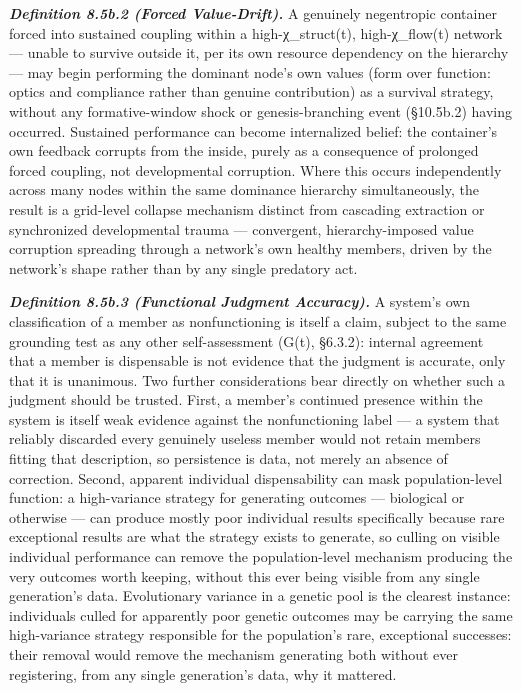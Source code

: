 \documentclass[
]{article}
\begin{document}
\emph{\textbf{Definition 8.5b.2 (Forced Value-Drift).}} A genuinely
negentropic container forced into sustained coupling within a
high-χ\_struct(t), high-χ\_flow(t) network --- unable to survive outside
it, per its own resource dependency on the hierarchy --- may begin
performing the dominant node's own values (form over function: optics
and compliance rather than genuine contribution) as a survival strategy,
without any formative-window shock or genesis-branching event (§10.5b.2)
having occurred. Sustained performance can become internalized belief:
the container's own feedback corrupts from the inside, purely as a
consequence of prolonged forced coupling, not developmental corruption.
Where this occurs independently across many nodes within the same
dominance hierarchy simultaneously, the result is a grid-level collapse
mechanism distinct from cascading extraction or synchronized
developmental trauma --- convergent, hierarchy-imposed value corruption
spreading through a network's own healthy members, driven by the
network's shape rather than by any single predatory act.

\emph{\textbf{Definition 8.5b.3 (Functional Judgment Accuracy).}} A
system's own classification of a member as nonfunctioning is itself a
claim, subject to the same grounding test as any other self-assessment
(G(t), §6.3.2): internal agreement that a member is dispensable is not
evidence that the judgment is accurate, only that it is unanimous. Two
further considerations bear directly on whether such a judgment should
be trusted. First, a member's continued presence within the system is
itself weak evidence against the nonfunctioning label --- a system that
reliably discarded every genuinely useless member would not retain
members fitting that description, so persistence is data, not merely an
absence of correction. Second, apparent individual dispensability can
mask population-level function: a high-variance strategy for generating
outcomes --- biological or otherwise --- can produce mostly poor
individual results specifically because rare exceptional results are
what the strategy exists to generate, so culling on visible individual
performance can remove the population-level mechanism producing the very
outcomes worth keeping, without this ever being visible from any single
generation's data. Evolutionary variance in a genetic pool is the
clearest instance: individuals culled for apparently poor genetic
outcomes may be carrying the same high-variance strategy responsible for
the population's rare, exceptional successes: their removal would remove
the mechanism generating both without ever registering, from any single
generation's data, why it mattered.
\end{document}
